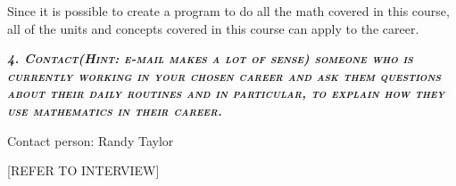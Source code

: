 \documentclass{article}
\begin{document}
Since it is possible to create a program to do all the math covered in this course, all of the units and concepts covered in this course can apply to the career.

\textbf{\emph{\textsc{4. Contact(Hint: e-mail makes a lot of sense) someone who is currently working in your chosen career and ask them questions about their daily routines and in particular, to explain how they use mathematics in their career.}}}

Contact person: Randy Taylor

[REFER TO INTERVIEW]
\end{document}
